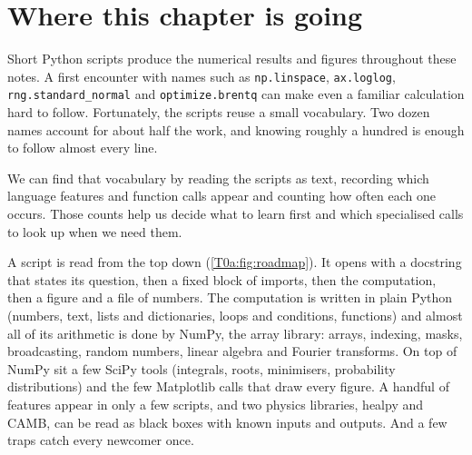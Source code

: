 \providecommand{\EightBcondBand}{}\renewcommand{\EightBcondBand}{1.8}
\providecommand{\EightBrowRuleBandApo}{}\renewcommand{\EightBrowRuleBandApo}{6.8\times10^{-6}}
\providecommand{\EightBfarLeakBandApo}{}\renewcommand{\EightBfarLeakBandApo}{0.44}
\providecommand{\EightBcondBandApo}{}\renewcommand{\EightBcondBandApo}{2}
\providecommand{\EightBrowRuleHoles}{}\renewcommand{\EightBrowRuleHoles}{7.0\times10^{-4}}
\providecommand{\EightBfarLeakHoles}{}\renewcommand{\EightBfarLeakHoles}{2.3}
\providecommand{\EightBcondHoles}{}\renewcommand{\EightBcondHoles}{1.1}
\providecommand{\Tzout}[1]{}
\section*{Where this chapter is going}
\label{T0a:sec:roadmap}

Short Python scripts produce the numerical results and figures throughout these notes. A first encounter with names such as \texttt{np.linspace}, \texttt{ax.loglog}, \texttt{rng.standard\_normal} and \texttt{optimize.brentq} can make even a familiar calculation hard to follow. Fortunately, the scripts reuse a small vocabulary. Two dozen names account for about half the work, and knowing roughly a hundred is enough to follow almost every line.

We can find that vocabulary by reading the scripts as text, recording which language features and function calls appear and counting how often each one occurs. Those counts help us decide what to learn first and which specialised calls to look up when we need them.

A script is read from the top down (\cref{T0a:fig:roadmap}). It opens with a docstring that states its question, then a fixed block of imports, then the computation, then a figure and a file of numbers. The computation is written in plain Python (numbers, text, lists and dictionaries, loops and conditions, functions) and almost all of its arithmetic is done by NumPy, the array library: arrays, indexing, masks, broadcasting, random numbers, linear algebra and Fourier transforms. On top of NumPy sit a few SciPy tools (integrals, roots, minimisers, probability distributions) and the few Matplotlib calls that draw every figure. A handful of features appear in only a few scripts, and two physics libraries, healpy and CAMB, can be read as black boxes with known inputs and outputs. And a few traps catch every newcomer once.

